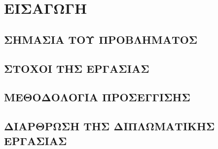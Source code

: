 \chapter{ΕΙΣΑΓΩΓΗ}

	\section{ΣΗΜΑΣΙΑ ΤΟΥ ΠΡΟΒΛΗΜΑΤΟΣ}

	\section{ΣΤΟΧΟΙ ΤΗΣ ΕΡΓΑΣΙΑΣ}

	\section{ΜΕΘΟΔΟΛΟΓΙΑ ΠΡΟΣΕΓΓΙΣΗΣ}

	\section{ΔΙΑΡΘΡΩΣΗ ΤΗΣ ΔΙΠΛΩΜΑΤΙΚΗΣ ΕΡΓΑΣΙΑΣ}

